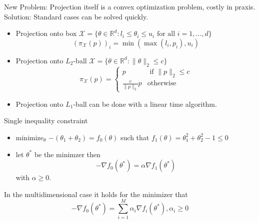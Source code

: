 \documentclass[12 pt]{article}        	%
\begin{document}
New Problem: Projection itself is a convex optimization problem, costly in praxis.
Solution: Standard cases can be solved quickly.

\begin{exmp}
    \begin{itemize}
        \item 
        Projection onto box $ \mathcal{ X } = \{ \theta \in \mathbb{ R }^d \colon l_i \leq \theta_i \leq u_i \text{ for all } i = 1 , \dotsc , d  \} $
        \[
            ( \pi_{ \mathcal{ X } } ( p ) )_i = \min ( \max ( l_i , p_i ) , u_i ) 
        \]

        \item 
        Projection onto $ L_2 $-ball $ \mathcal{ X } = \{ \theta \in \mathbb{ R }^d \colon \lVert \theta \rVert_2 \leq c \} $
        \[
            \pi_{ \mathcal{ X } } ( p ) = 
            \begin{cases}
                p & \text{ if  } \lVert p \rVert_2 \leq c
                \\
                \frac{ c }{ \lVert p \rVert_2 }p & \text{otherwise}
            \end{cases}
        \]

        \item 
        Projection onto $ L_1 $-ball can be done with a linear time algorithm.
        
    \end{itemize}
\end{exmp}

\begin{exmp}
    Single inequality constraint
    \begin{itemize}
        \item 
        minimize$_{ \theta } $ $ - ( \theta_1 + \theta_2 ) = f_0 ( \theta ) $
        such that 
        $ f_1 ( \theta ) =  \theta_1^2 + \theta_2^2 -1 \leq 0 $
        \item 
        let $ \theta^* $ be the minimzer then
        \[ - \nabla f_0 ( \theta   ^* ) = \alpha \nabla f_1 ( \theta^* ) \]
        with $ \alpha \geq 0 $.
    \end{itemize}

    In the multidimensional case it holds for the minimizer that 
    \begin{equation}
    \label{eq:optimality_criterion}    
        - \nabla f_0 ( \theta^* ) 
        = 
        \sum_{ i = 1 }^M \alpha_i \nabla f_i ( \theta^* ) , \alpha_i \geq 0 
    \end{equation}
    
\end{exmp}
\end{document}
